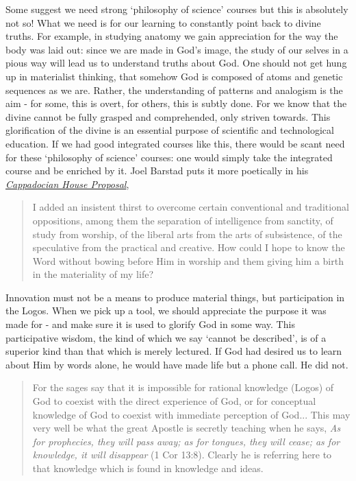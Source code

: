 \documentclass[letterpaper]{article}
\begin{document}
Some suggest we need strong `philosophy of science' courses but this is absolutely not so! What we need is for our learning to constantly point back to divine truths. For example, in studying anatomy we gain appreciation for the way the body was laid out: since we are made in God's image, the study of our selves in a pious way will lead us to understand truths about God. One should not get hung up in materialist thinking, that somehow God is composed of atoms and genetic sequences as we are. Rather, the understanding of patterns and analogism is the aim - for some, this is overt, for others, this is subtly done. For we know that the divine cannot be fully grasped and comprehended, only striven towards. This glorification of the divine is an essential purpose of scientific and technological education. If we had good integrated courses like this, there would be scant need for these `philosophy of science' courses: one would simply take the integrated course and be enriched by it. Joel Barstad puts it more poetically in his \href{https://byzantinela.com/cappadocian-house-proposal/}{\textit{Cappadocian House Proposal}},

\begin{quote}
  I added an insistent thirst to overcome certain conventional and traditional oppositions, among them the separation of intelligence from sanctity, of study from worship, of the liberal arts from the arts of subsistence, of the speculative from the practical and creative. How could I hope to know the Word without bowing before Him in worship and them giving him a birth in the materiality of my life?
\end{quote}


Innovation must not be a means to produce material things, but participation in the Logos. When we pick up a tool, we should appreciate the purpose it was made for - and make sure it is used to glorify God in some way. This participative wisdom, the kind of which we say `cannot be described', is of a superior kind than that which is merely lectured. If God had desired us to learn about Him by words alone, he would have made life but a phone call. He did not.

\begin{quote}
  For the sages say that it is impossible for rational knowledge (Logos) of God to coexist with the direct experience of God, or for conceptual knowledge of God to coexist with immediate perception of God... This may very well be what the great Apostle is secretly teaching when he says, \textit{As for prophecies, they will pass away; as for tongues, they will cease; as for knowledge, it will disappear} (1 Cor 13:8). Clearly he is referring here to that knowledge which is found in knowledge and ideas.
\end{quote}
\end{document}

